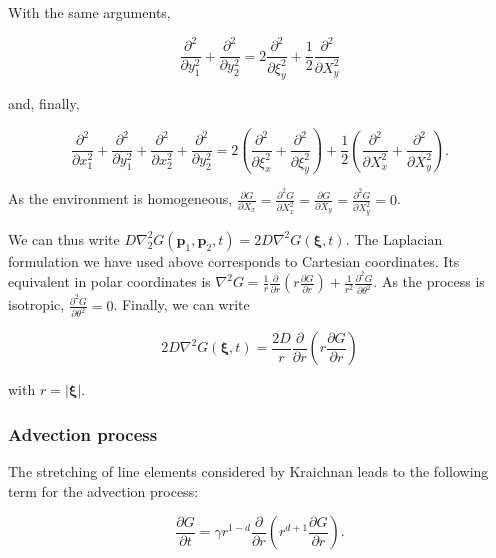 With the same arguments,

\begin{equation}
\frac{\partial^{2}}{\partial y_{1}^{2}}+\frac{\partial^{2}}{\partial y_{2}^{2}}=2\frac{\partial^{2}}{\partial\xi_{y}^{2}}+\frac{1}{2}\frac{\partial^{2}}{\partial X_{y}^{2}}
\end{equation}

and, finally, 

\begin{equation}
\frac{\partial^{2}}{\partial x_{1}^{2}}+\frac{\partial^{2}}{\partial y_{1}^{2}}+\frac{\partial^{2}}{\partial x_{2}^{2}}+\frac{\partial^{2}}{\partial y_{2}^{2}}=2\left(\frac{\partial^{2}}{\partial\xi_{x}^{2}}+\frac{\partial^{2}}{\partial\xi_{y}^{2}}\right)+\frac{1}{2}\left(\frac{\partial^{2}}{\partial X_{x}^{2}}+\frac{\partial^{2}}{\partial X_{y}^{2}}\right).\label{eq:final}
\end{equation}

As the environment is homogeneous, $\frac{\partial G}{\partial X_{x}}=\frac{\partial^{2}G}{\partial X_{x}^{2}}=\frac{\partial G}{\partial X_{y}}=\frac{\partial^{2}G}{\partial X_{y}^{2}}=0$.

We can thus write $D\nabla_{2}^{2}G(\mathbf{p}_{1},\mathbf{p}_{2},t)=2D\nabla^{2}G(\boldsymbol{\xi},t)$.
The Laplacian formulation we have used above corresponds to Cartesian
coordinates. Its equivalent in polar coordinates is $\nabla^{2}G=\frac{1}{r}\frac{\partial}{\partial r}\left(r\frac{\partial G}{\partial r}\right)+\frac{1}{r^{2}}\frac{\partial^{2}G}{\partial\theta^{2}}$.
As the process is isotropic, $\frac{\partial^{2}G}{\partial\theta^{2}}=0$.
Finally, we can write

\begin{equation}
2D\nabla^{2}G(\boldsymbol{\xi},t)=\frac{2D}{r}\frac{\partial}{\partial r}\left(r\frac{\partial G}{\partial r}\right)
\end{equation}

with $r=|\boldsymbol{\xi}|$.

\subsubsection*{Advection process}

The stretching of line elements considered by Kraichnan \cite{kraichnan_convection_1974} leads to the following term for the advection process:

\begin{equation}
\frac{\partial G}{\partial t}=\gamma r^{1-d}\frac{\partial}{\partial r}\left(r^{d+1}\frac{\partial G}{\partial r}\right). \label{eq:eq_2_Young_advection}
\end{equation}

